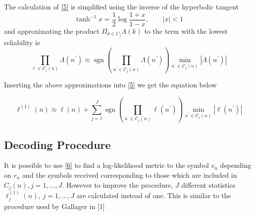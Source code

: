 \documentclass[11pt, oneside, dvipdfmx]{book}
\begin{document}
The calculation of \ref{5} is simplified using the inverse of the hyperbolic tangent
$$
\tanh ^{-1} x=\frac{1}{2} \log \frac{1+x}{1-x}, \qquad|x|<1
$$
and approximating the product  $
\Pi_{k \in C_{j}} \Lambda(k)
$  to the term with the lowest reliability ie $$
\prod_{\ell \in \mathcal{C}_{j}(n)} \Lambda\left(n^{\prime}\right) \approx \operatorname{sgn}\left(\prod_{n^{\prime} \in \mathcal{C}_{j}(n)} \Lambda\left(n^{\prime}\right)\right) \min _{n^{\prime} \in \mathcal{C}_{j}(n)}\left|\Lambda\left(n^{\prime}\right)\right|
$$

Inserting the above approximations into \ref{5} we get the equation below

\begin{equation}
\ell^{(1)}(n) \approx \ell(n)+\sum_{j=1}^{J} \operatorname{sgn}\left(\prod_{n^{\prime} \in \mathcal{C}_{j}(n)} \ell\left(n^{\prime}\right)\right) \min _{n^{\prime} \in \mathcal{C}_{j}(n)}\left|\ell\left(n^{\prime}\right)\right|
\label{6}
\end{equation}


\subsection{Decoding Procedure}
It is possible to use \ref{6}  to find a log-likelihood metric to the symbol
$v_n$ depending on $r_n$ and the symbols received corresponding to those
which are included in $C_j (n),j = 1,..., J$. However to improve the procedure, $J$ different statistics $\ell^{(1)}_j(n),~j=1,...,J$ are calculated instead of one. This is similar to the procedure used by Gallager in [1]
\end{document}
